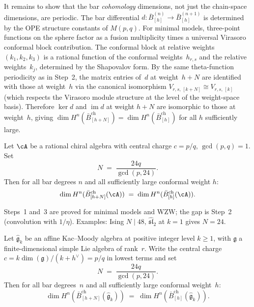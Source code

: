 \begin{evidence}
It remains to show that the bar \emph{cohomology} dimensions, not just the
chain-space dimensions, are periodic.  The bar differential
$d \colon \bar{B}^{(n)}_{[h]} \to \bar{B}^{(n+1)}_{[h]}$ is determined by the
OPE structure constants of $M(p,q)$.  For minimal models, three-point functions
on the sphere factor as a fusion multiplicity times a universal Virasoro
conformal block contribution.  The conformal block at relative weights
$(k_1, k_2, k_3)$ is a rational function of the conformal weights~$h_{r,s}$
and the relative weights~$k_j$, determined by the Shapovalov form.  By the
same theta-function periodicity as in Step~2, the matrix entries of~$d$ at
weight~$h+N$ are identified with those at weight~$h$ via the canonical
isomorphism $V_{r,s,\,[k+N]} \cong V_{r,s,\,[k]}$ (which respects the
Virasoro module structure at the level of the weight-space basis).  Therefore
$\ker d$ and $\operatorname{im} d$ at weight $h+N$ are isomorphic to those at
weight~$h$, giving
$\dim H^n(\bar{B}_{[h+N]}^{\mathrm{ch}}) = \dim H^n(\bar{B}_{[h]}^{\mathrm{ch}})$
for all $h$ sufficiently large.
\end{evidence}

\begin{conjecture}
\label{conj:modular-periodicity}
Let $\cA$ be a rational chiral algebra with central charge $c = p/q$, $\gcd(p,q) = 1$.  Set
\[
N \;=\; \frac{24q}{\gcd(p,24)}.
\]
Then for all bar degrees $n$ and all sufficiently large conformal weight $h$:
\[
\dim H^n(\bar{B}_{[h+N]}^{\mathrm{ch}}(\cA))
\;=\;
\dim H^n(\bar{B}_{[h]}^{\mathrm{ch}}(\cA)).
\]
\end{conjecture}

\begin{remark}\label{rem:modular-periodicity-scope}
Steps~1 and~3 are proved for minimal models and WZW; the gap is Step~2 (convolution with $1/\eta$).  Examples: Ising $N \mid 48$, $\widehat{\mathfrak{sl}}_2$ at $k=1$ gives $N=24$.
\end{remark}

\begin{conjecture}
\label{conj:modular-periodicity-wzw}
Let $\widehat{\mathfrak{g}}_k$ be an affine Kac--Moody algebra at
positive integer level $k \geq 1$, with $\mathfrak{g}$ a finite-dimensional
simple Lie algebra of rank~$r$.  Write the central charge
$c = k\dim(\mathfrak{g})/(k + h^\vee) = p/q$ in lowest terms and set
\[
N \;=\; \frac{24q}{\gcd(p,24)}.
\]
Then for all bar degrees~$n$ and all sufficiently large conformal
weight~$h$:
\[
\dim H^n(\bar{B}_{[h+N]}^{\mathrm{ch}}(\widehat{\mathfrak{g}}_k))
\;=\;
\dim H^n(\bar{B}_{[h]}^{\mathrm{ch}}(\widehat{\mathfrak{g}}_k)).
\]
\end{conjecture}

